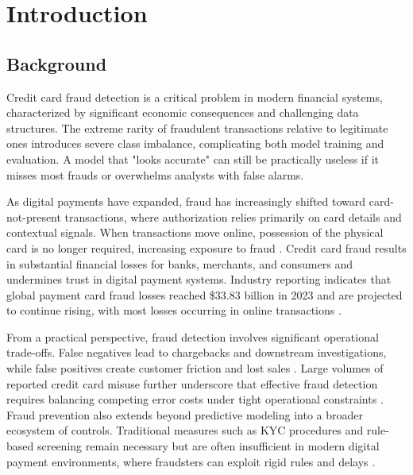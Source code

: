 \documentclass[oneside,12pt,parskip=half,american,numbers=noenddot]{scrreprt}
\renewcommand*{\chapterpagestyle}{frontmatter} %
\begin{document}
\pagestyle{mainmatter}
\renewcommand*{\chapterpagestyle}{mainmatter}

\onehalfspacing

\chapter{Introduction}\label{Introduction}

\section{Background}\label{Background}
Credit card fraud detection is a critical problem in modern financial systems, characterized by significant economic consequences and challenging data structures. The extreme rarity of fraudulent transactions relative to legitimate ones introduces severe class imbalance, complicating both model training and evaluation. A model that "looks accurate" can still be practically useless if it misses most frauds or overwhelms analysts with false alarms.

As digital payments have expanded, fraud has increasingly shifted toward card-not-present transactions, where authorization relies primarily on card details and contextual signals. When transactions move online, possession of the physical card is no longer required, increasing exposure to fraud \parencite{xuan_random_2018}. Credit card fraud results in substantial financial losses for banks, merchants, and consumers and undermines trust in digital payment systems. Industry reporting indicates that global payment card fraud losses reached \$33.83 billion in 2023 and are projected to continue rising, with most losses occurring in online transactions \parencite{nilson_report_card_2023}.

From a practical perspective, fraud detection involves significant operational trade-offs. False negatives lead to chargebacks and downstream investigations, while false positives create customer friction and lost sales \parencite{jpmorgan_jpmorgan_2025}. Large volumes of reported credit card misuse further underscore that effective fraud detection requires balancing competing error costs under tight operational constraints \parencite{federal_trade_commission_consumer_2024}. Fraud prevention also extends beyond predictive modeling into a broader ecosystem of controls. Traditional measures such as KYC procedures and rule-based screening remain necessary but are often insufficient in modern digital payment environments, where fraudsters can exploit rigid rules and delays \parencite{aci_worldwide_driving_2025}.
\end{document}
